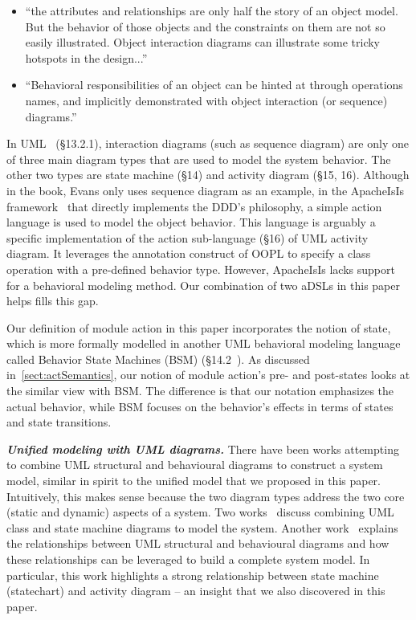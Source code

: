 \begin{itemize}
  \item ``the attributes and relationships are only half the story of an object model. But the behavior of those objects and the constraints on them are not so easily illustrated. Object interaction diagrams can illustrate some tricky hotspots in the design...''
  
  \item ``Behavioral responsibilities of an object can be hinted at through operations names, and implicitly
  demonstrated with object interaction (or sequence) diagrams.''
\end{itemize}

In UML~\cite{omg_unified_2015} (\S{13.2.1}), interaction diagrams (such as sequence diagram) are only one of three main diagram types that are used to model the system behavior. The other two types are state machine (\S{14}) and activity diagram (\S{15, 16}). Although in the book, Evans only uses sequence diagram as an example, in the ApacheIsIs framework~\cite{dan_haywood_apache_2013} that directly implements the DDD's philosophy, a simple action language is used to model the object behavior. This language is arguably a specific implementation of the action sub-language (\S{16}) of UML activity diagram. It leverages the annotation construct of OOPL to specify a class operation with a pre-defined behavior type. 
However, ApacheIsIs lacks support for a behavioral modeling method. Our combination of two aDSLs in this paper helps fills this gap.

Our definition of module action in this paper incorporates the notion of state, which is more formally modelled in another UML behavioral modeling language called Behavior State Machines (BSM) (\S{14.2}~\cite{omg_unified_2015}). 
As discussed in~\ref{sect:actSemantics}, our notion of module action's pre- and post-states looks at the similar view with BSM. The difference is that our notation emphasizes the actual behavior, while BSM focuses on the behavior's effects in terms of states and state transitions.

\textbf{\textit{Unified modeling with UML diagrams.}}
There have been works attempting to combine UML structural and behavioural diagrams to construct a system model, similar in spirit to the unified model that we proposed in this paper. Intuitively, this makes sense because the two diagram types address the two core (static and dynamic) aspects of a system. Two works~\cite{kohler_integrating_2000, niaz_object-oriented_2005} discuss combining UML class and state machine diagrams to model the system. Another work~\cite{selonen_transformations_2003} explains the relationships between UML structural and behavioural diagrams and how these relationships can be leveraged to build a complete system model. In particular, this work highlights a strong relationship between state machine (\aka statechart) and activity diagram -- an insight that we also discovered in this paper. 

